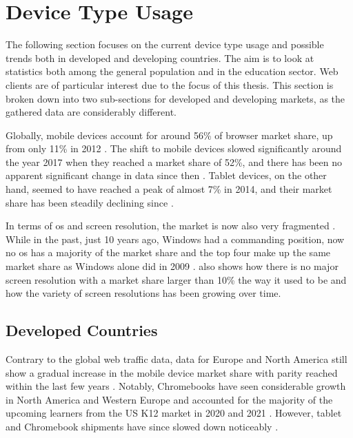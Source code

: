 \section{Device Type Usage}
\label{sec:device-types}

The following section focuses on the current device type usage and possible trends both in developed and developing countries.
The aim is to look at statistics both among the general population and in the education sector.
Web clients are of particular interest due to the focus of this thesis.
This section is broken down into two sub-sections for developed and developing markets, as the gathered data are considerably different.

Globally, mobile devices account for around 56\% of browser market share, up from only 11\% in 2012 \parencite{StatCounter_2023}.
The shift to mobile devices slowed significantly around the year 2017 when they reached a market share of 52\%, and there has been no apparent significant change in data since then \parencite{StatCounter_2023}.
Tablet devices, on the other hand, seemed to have reached a peak of almost 7\% in 2014, and their market share has been steadily declining since \parencite{StatCounter_2023}.

In terms of \gls{os} and screen resolution, the market is now also very fragmented \parencites{StatCounter_OS_2023}{StatCounter_Resolution_2023}.
While in the past, just 10 years ago, Windows had a commanding position, now no \gls{os} has a majority of the market share and the top four make up the same market share as Windows alone did in 2009 \parencite{StatCounter_OS_2023}.
\textcite{StatCounter_Resolution_2023} also shows how there is no major screen resolution with a market share larger than 10\% the way it used to be and how the variety of screen resolutions has been growing over time.

\subsection{Developed Countries}

Contrary to the global web traffic data, data for Europe and North America still show a gradual increase in the mobile device market share with parity reached within the last few years \parencites{StatCounter_Europe_2023}{StatCounter_NorthAmerica_2023}.
Notably, Chromebooks have seen considerable growth in North America and Western Europe and accounted for the majority of the upcoming learners from the US K12 market in 2020 and 2021 \parencite{Boreham_2019, IDC_2021}.
However, tablet and Chromebook shipments have since slowed down noticeably \parencite{IDC_2022}.

